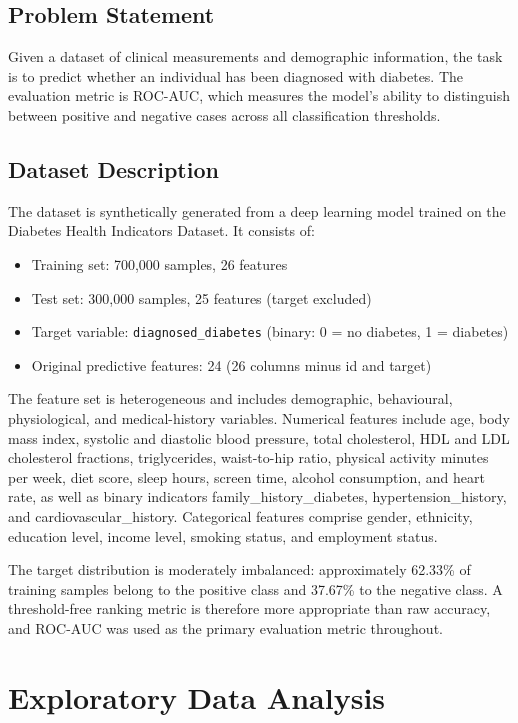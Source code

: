 \documentclass[a4paper,11pt]{article}
\begin{document}
\subsection{Problem Statement}
Given a dataset of clinical measurements and demographic information, the task is to predict whether an individual has been diagnosed with diabetes. The evaluation metric is ROC-AUC, which measures the model's ability to distinguish between positive and negative cases across all classification thresholds.

\subsection{Dataset Description}
The dataset is synthetically generated from a deep learning model trained on the Diabetes Health Indicators Dataset. It consists of:
\begin{itemize}
    \item Training set: 700,000 samples, 26 features
    \item Test set: 300,000 samples, 25 features (target excluded)
    \item Target variable: \texttt{diagnosed\_diabetes} (binary: 0 = no diabetes, 1 = diabetes)
    \item Original predictive features: 24 (26 columns minus id and target)
\end{itemize}

The feature set is heterogeneous and includes demographic, behavioural, physiological, and medical-history variables. Numerical features include age, body mass index, systolic and diastolic blood pressure, total cholesterol, HDL and LDL cholesterol fractions, triglycerides, waist-to-hip ratio, physical activity minutes per week, diet score, sleep hours, screen time, alcohol consumption, and heart rate, as well as binary indicators family\_history\_diabetes, hypertension\_history, and cardiovascular\_history. Categorical features comprise gender, ethnicity, education level, income level, smoking status, and employment status.

The target distribution is moderately imbalanced: approximately 62.33\% of training samples belong to the positive class and 37.67\% to the negative class. A threshold-free ranking metric is therefore more appropriate than raw accuracy, and ROC-AUC was used as the primary evaluation metric throughout.

\section{Exploratory Data Analysis}
\end{document}
